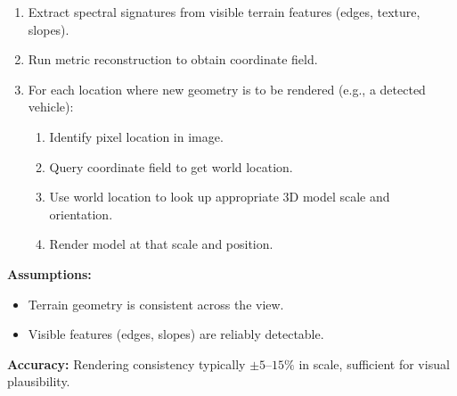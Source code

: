 \documentclass[11pt,twocolumn,a4paper]{article}
\theoremstyle{definition}
\begin{document}
\begin{enumerate}[leftmargin=1.4em]
  \item Extract spectral signatures from visible terrain features (edges, texture, slopes).
  \item Run metric reconstruction to obtain coordinate field.
  \item For each location where new geometry is to be rendered (e.g., a detected vehicle):
    \begin{enumerate}[leftmargin=1.4em]
      \item Identify pixel location in image.
      \item Query coordinate field to get world location.
      \item Use world location to look up appropriate 3D model scale and orientation.
      \item Render model at that scale and position.
    \end{enumerate}
\end{enumerate}

\textbf{Assumptions:}
\begin{itemize}
  \item Terrain geometry is consistent across the view.
  \item Visible features (edges, slopes) are reliably detectable.
\end{itemize}

\textbf{Accuracy:} Rendering consistency typically $\pm 5$--$15\%$ in scale, sufficient for visual plausibility.
\end{document}
